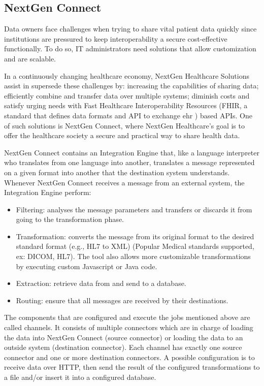 \subsection*{NextGen Connect}
Data owners face challenges when trying to share vital patient data quickly since institutions are pressured to keep interoperability a secure cost-effective functionally.
To do so, IT administrators need solutions that allow customization and are scalable.

In a continuously changing healthcare economy, NextGen Healthcare Solutions assist in supersede these challenges by: increasing the capabilities of sharing data; efficiently combine and transfer data over multiple systems; diminish costs and satisfy urging needs with Fast Healthcare Interoperability Resources (FHIR, a standard that defines data formats and API to exchange \gls{ehr} ) based APIs.
One of such solutions is NextGen Connect, where NextGen Healthcare's goal is to offer the healthcare society a secure and practical way to share health data.

NextGen Connect contains an Integration Engine that, like a language interpreter who translates from one language into another, translates a message represented on a given format into another that the destination system understands.
Whenever NextGen Connect receives a message from an external system, the Integration Engine perform:
\begin{itemize}
    \item Filtering: analyses the message parameters and transfers or discards it from going to the transformation phase.
    \item Transformation: converts the message from its original format to the desired standard format (e.g., HL7 to XML) (Popular Medical standards supported, ex: DICOM, HL7). The tool also allows more customizable transformations by executing custom Javascript or Java code.
    \item Extraction: retrieve data from and send to a database.
    \item Routing: ensure that all messages are received by their destinations.
\end{itemize}
The components that are configured and execute the jobs mentioned above are called channels.
It consists of multiple connectors which are in charge of loading the data into NextGen Connect (source connector) or loading the data to an outside system (destination connector).
Each channel has exactly one source connector and one or more destination connectors.
A possible configuration is to receive data over HTTP, then send the result of the configured transformations to a file and/or insert it into a configured database.

